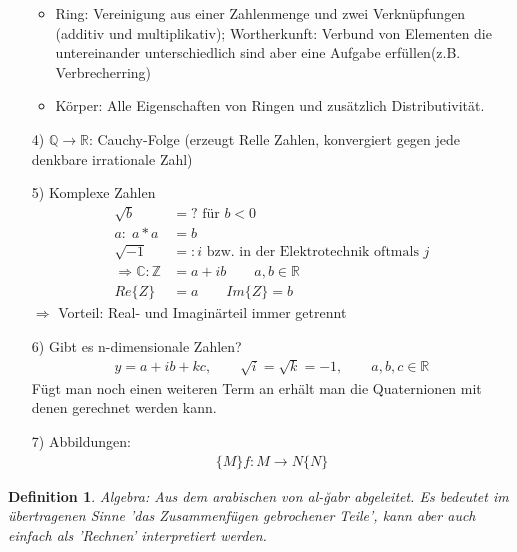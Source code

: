 \documentclass[12pt,a4paper]{report}%
\newtheorem{definition}[satz]{Definition}
\numberwithin{equation}{section}
\newcommand{\R}{\mathbb{R}} %
\newcommand{\Z}{\mathbb{Z}}
\newcommand{\Q}{\mathbb{Q}}
\newcommand{\C}{\mathbb{C}}
\numberwithin{equation}{subsection}
\begin{document}
\begin{itemize}
\begin{itemize}
		      \item Ring: Vereinigung aus einer Zahlenmenge und zwei Verknüpfungen (additiv und multiplikativ); Wortherkunft: Verbund von Elementen die untereinander unterschiedlich sind aber eine Aufgabe erfüllen(z.B. Verbrecherring)
		      \item Körper: Alle Eigenschaften von Ringen und zusätzlich Distributivität.
		    \end{itemize}
	    \item[4) ] $\Q \rightarrow \R$: Cauchy-Folge (erzeugt Relle Zahlen, konvergiert gegen jede denkbare irrationale Zahl)
	    \item[5) ] Komplexe Zahlen
			    \begin{align*}
			      \sqrt{b} &= ?  \text{ für } b < 0\\ 
			      a:\; a * a &= b\\
			      \sqrt{-1} &=: i \text{ bzw. in der Elektrotechnik oftmals } j \\
			      \Rightarrow \C: \Z &= a+ib \qquad a,b \in \R\\
			      Re\lbrace Z \rbrace &= a \qquad Im\lbrace Z \rbrace = b
			    \end{align*}
			    $\Rightarrow$ Vorteil: Real- und Imaginärteil immer getrennt
	    \item[6) ] Gibt es n-dimensionale Zahlen?
	      \begin{align*}
	        y = a + ib + kc,\qquad \sqrt{i} = \sqrt{k} = -1, \qquad a,b,c \in \R
	      \end{align*}
	      Fügt man noch einen weiteren Term an erhält man die Quaternionen mit denen gerechnet werden kann.
	    \item[7) ] Abbildungen:
	    \begin{align*}
	      \lbrace M \rbrace f: M \rightarrow N \lbrace N \rbrace 
	    \end{align*}
	  \end{itemize}
	  \begin{definition}
	    Algebra: Aus dem arabischen von \textit{al-\u{g}abr} abgeleitet. Es bedeutet im übertragenen Sinne 'das Zusammenfügen gebrochener Teile', kann aber auch einfach als 'Rechnen' interpretiert werden.
	  \end{definition}
\end{document}
